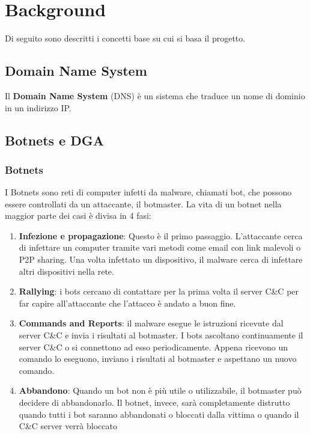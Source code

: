 \documentclass[12pt,a4paper,openright,twoside]{book}
\begin{document}

\chapter{Background}

Di seguito sono descritti i concetti base su cui si basa il progetto.

\section{Domain Name System}
Il \textbf{Domain Name System} (DNS) è un sistema che
traduce un nome di dominio in un indirizzo IP.




\section{Botnets e DGA}

\subsection{Botnets}

I Botnets sono reti di computer infetti da malware, chiamati bot,
che possono essere controllati da un attaccante, il botmaster.
La vita di un botnet nella maggior parte dei casi è divisa in 4 fasi:
\begin{enumerate}
    \item \textbf{Infezione e propagazione}: Questo è il primo
    passaggio. L'attaccante cerca di infettare un computer
    tramite vari metodi come email con link malevoli o \acrfull{P2P} sharing.
    Una volta infettato un dispositivo, il malware cerca di infettare
    altri dispositivi nella rete.

    \item \textbf{Rallying}: i bots cercano di contattare per la prima volta
    il server \acrshort{C&C} per far capire all'attaccante
    che l'attacco è andato a buon fine.

    \item \textbf{Commands and Reports}: il malware esegue le istruzioni
    ricevute dal server \acrshort{C&C} e invia i risultati al botmaster.
    I bots ascoltano continuamente il server \acrshort{C&C} 
    o si connettono ad esso periodicamente. Appena ricevono
    un comando lo eseguono, inviano i risultati al botmaster
    e aspettano un nuovo comando.

    \item \textbf{Abbandono}: Quando un bot non è più utile o utilizzabile,
    il botmaster può decidere di abbandonarlo. Il botnet, invece,
    sarà completamente distrutto quando tutti i bot saranno
    abbandonati o bloccati dalla vittima o quando il \acrshort{C&C} server
    verrà bloccato


\end{enumerate}
\end{document}
